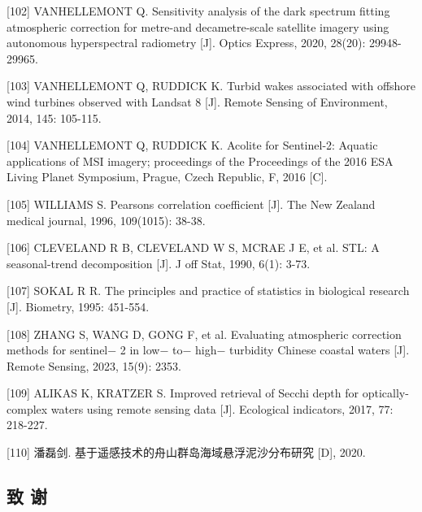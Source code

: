 \documentclass[
  12pt,
]{article}
\begin{document}
{[}102{]} VANHELLEMONT Q. Sensitivity analysis of the dark spectrum
fitting atmospheric correction for metre-and decametre-scale satellite
imagery using autonomous hyperspectral radiometry {[}J{]}. Optics
Express, 2020, 28(20): 29948-29965.

{[}103{]} VANHELLEMONT Q, RUDDICK K. Turbid wakes associated with
offshore wind turbines observed with Landsat 8 {[}J{]}. Remote Sensing
of Environment, 2014, 145: 105-115.

{[}104{]} VANHELLEMONT Q, RUDDICK K. Acolite for Sentinel-2: Aquatic
applications of MSI imagery; proceedings of the Proceedings of the 2016
ESA Living Planet Symposium, Prague, Czech Republic, F, 2016 {[}C{]}.

{[}105{]} WILLIAMS S. Pearson\textquotesingle s correlation coefficient
{[}J{]}. The New Zealand medical journal, 1996, 109(1015): 38-38.

{[}106{]} CLEVELAND R B, CLEVELAND W S, MCRAE J E, et al. STL: A
seasonal-trend decomposition {[}J{]}. J off Stat, 1990, 6(1): 3-73.

{[}107{]} SOKAL R R. The principles and practice of statistics in
biological research {[}J{]}. Biometry, 1995: 451-554.

{[}108{]} ZHANG S, WANG D, GONG F, et al. Evaluating atmospheric
correction methods for sentinel− 2 in low− to− high− turbidity Chinese
coastal waters {[}J{]}. Remote Sensing, 2023, 15(9): 2353.

{[}109{]} ALIKAS K, KRATZER S. Improved retrieval of Secchi depth for
optically-complex waters using remote sensing data {[}J{]}. Ecological
indicators, 2017, 77: 218-227.

{[}110{]} 潘磊剑. 基于遥感技术的舟山群岛海域悬浮泥沙分布研究 {[}D{]},
2020.

\subsection{致 谢}\label{ux81f4-ux8c22}
\end{document}
